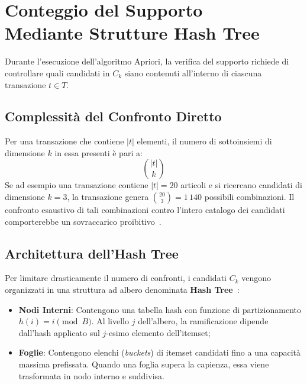 \section[Conteggio del Supporto con Hash Tree]{Conteggio del Supporto\\Mediante Strutture Hash Tree}
\label{sec:dm-hash-tree-counting}

Durante l'esecuzione dell'algoritmo Apriori, la verifica del supporto richiede di controllare quali candidati in $C_k$ siano contenuti all'interno di ciascuna transazione $t \in T$.

\FloatBarrier
\subsection{Complessità del Confronto Diretto}
Per una transazione che contiene $|t|$ elementi, il numero di sottoinsiemi di dimensione $k$ in essa presenti è pari a:
\begin{equation}
\binom{|t|}{k}
\end{equation}
Se ad esempio una transazione contiene $|t| = 20$ articoli e si ricercano candidati di dimensione $k=3$, la transazione genera $\binom{20}{3} = 1\,140$ possibili combinazioni. Il confronto esaustivo di tali combinazioni contro l'intero catalogo dei candidati comporterebbe un sovraccarico proibitivo~\cite{tan2018}.

\FloatBarrier
\subsection{Architettura dell'Hash Tree}
Per limitare drasticamente il numero di confronti, i candidati $C_k$ vengono organizzati in una struttura ad albero denominata \textbf{Hash Tree}~\cite{agrawal1994, tan2018}:
\begin{itemize}
    \item \textbf{Nodi Interni}: Contengono una tabella hash con funzione di partizionamento $h(i) = i \pmod B$. Al livello $j$ dell'albero, la ramificazione dipende dall'hash applicato sul $j$-esimo elemento dell'itemset;
    \item \textbf{Foglie}: Contengono elenchi (\textit{buckets}) di itemset candidati fino a una capacità massima prefissata. Quando una foglia supera la capienza, essa viene trasformata in nodo interno e suddivisa.
\end{itemize}

